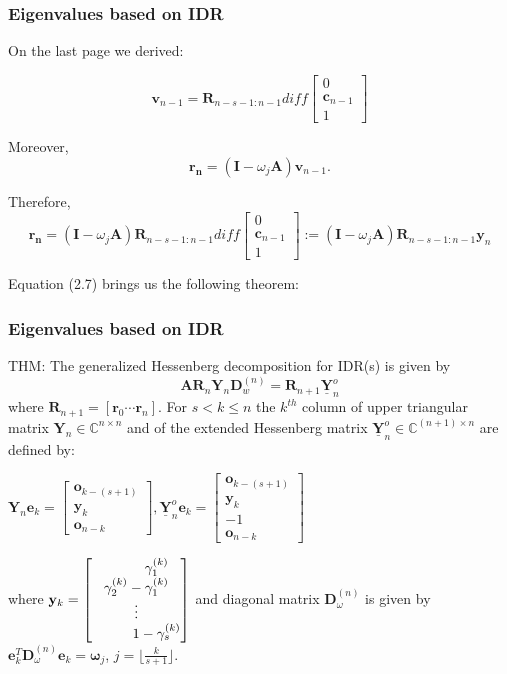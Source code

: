 \documentclass[mathserif]{beamer}
\begin{document}
\begin{frame}
\frametitle{Eigenvalues based on IDR}
On the last page we derived:

\[\mathbf{v}_{n-1}=  \mathbf{R}_{n-s-1:n-1}  diff \begin{bmatrix}
        0   \\ 
  \mathbf{c}_{n-1} \\
        1
\end{bmatrix}\]
\pause

Moreover, \[\mathbf{r_n}=(\mathbf{I}-\omega_j\mathbf{A})\mathbf{v}_{n-1}.\]

Therefore,  \[ \tag{2.7} \mathbf{r_n}= (\mathbf{I}-\omega_j\mathbf{A})\mathbf{R}_{n-s-1:n-1}  diff \begin{bmatrix}
        0   \\ 
  \mathbf{c}_{n-1} \\
        1
\end{bmatrix}:= (\mathbf{I}-\omega_j\mathbf{A})\mathbf{R}_{n-s-1:n-1}\mathbf{y}_n \]

\pause Equation (2.7) brings us the following theorem:
\end{frame}

\begin{frame}
\frametitle{Eigenvalues based on IDR}
THM: The generalized Hessenberg decomposition for IDR(s) is given by \[ \mathbf{A}\mathbf{R}_n\mathbf{Y}_n\mathbf{D}_w^{(n)}= \mathbf{R}_{n+1} \underline {\mathbf{Y}}_n^o   \] where $\mathbf{R}_{n+1}=[\mathbf{r}_0 \cdots \mathbf{r}_n]$. For $s<k\le n$ the $k^{th}$ column of upper triangular matrix $\mathbf{Y}_n \in \mathbb{C}^{n \times n}$ and of the extended  Hessenberg matrix $\underline{\mathbf{Y}}_n^o \in \mathbb{C}^{(n+1) \times n}$ are defined by:
\begin{center}$\mathbf{Y}_n \mathbf{e}_k =  \begin{bmatrix}
        \mathbf{o}_{k-(s+1)}   \\ 
  \mathbf{y}_k \\
        \mathbf{o}_{n-k}
\end{bmatrix},  
\underline{\mathbf{Y}}_n^o \mathbf{e}_k =  \begin{bmatrix}
        \mathbf{o}_{k-(s+1)}   \\ 
  \mathbf{y}_k \\
    -1 \\
        \mathbf{o}_{n-k}
\end{bmatrix} $ \end{center}

where $\mathbf{y}_k =  \begin{bmatrix}
\hspace{.4in} \gamma_1^{(k)}    \\ 
  \gamma_2^{(k)}- \gamma_1^{(k)} \\
 \vdots \\
\hspace{.4in} 1- \gamma_s^{(k)} 
\end{bmatrix}$ and diagonal matrix $\mathbf{D}_\omega^{(n)}$ is given by $\mathbf{e}_k^T \mathbf{D}_\omega^{(n)}\mathbf{e}_k=\mathbf{\omega}_j$, $j=\lfloor{\frac{k}{s+1}}\rfloor$.

\end{frame}
\end{document}
